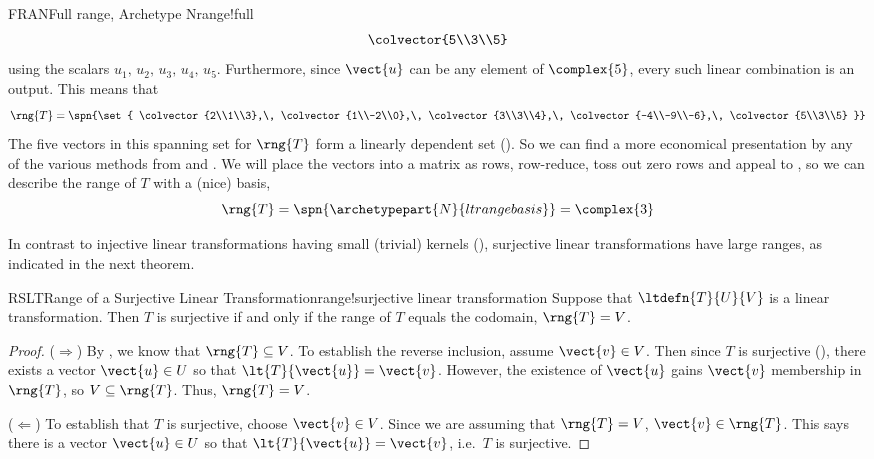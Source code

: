 \begin{example}{FRAN}{Full range, Archetype N}{range!full}
\begin{align*}
\colvector{5\\3\\5}
\end{align*}
%
using the scalars $u_1,\,u_2,\,u_3,\,u_4,\,u_5$.  Furthermore, since $\vect{u}$ can be any element of $\complex{5}$, every such linear combination is an output.  This means that
%
\begin{equation*}
\rng{T}=\spn{\set{
\colvector{2\\1\\3},\,
\colvector{1\\-2\\0},\,
\colvector{3\\3\\4},\,
\colvector{-4\\-9\\-6},\,
\colvector{5\\3\\5}
}}
\end{equation*}
%
The five vectors in this spanning set for $\rng{T}$ form a linearly dependent set ().  So we can find a more economical presentation by any of the various methods from  and .  We will place the vectors into a matrix as rows, row-reduce, toss out zero rows and appeal to , so we can describe the range of $T$ with a (nice) basis,
%
\begin{equation*}
\rng{T}=\spn{\archetypepart{N}{ltrangebasis}}=\complex{3}
\end{equation*}
%
\end{example}
%
In contrast to injective linear transformations having small (trivial) kernels (), surjective linear transformations have large ranges, as indicated in the next theorem.
%
\begin{theorem}{RSLT}{Range of a Surjective Linear Transformation}{range!surjective linear transformation}
Suppose that $\ltdefn{T}{U}{V}$ is a linear transformation.  Then $T$ is surjective if and only if the range of $T$ equals the codomain, $\rng{T}=V$.
\end{theorem}
%
\begin{proof}
($\Rightarrow$) By , we know that $\rng{T}\subseteq V$.  To establish the reverse inclusion, assume $\vect{v}\in V$.  Then since $T$ is surjective (), there exists a vector $\vect{u}\in U$ so that $\lt{T}{\vect{u}}=\vect{v}$.  However, the existence of $\vect{u}$ gains $\vect{v}$ membership in $\rng{T}$, so $V\subseteq\rng{T}$.  Thus, $\rng{T}=V$.\par
%
($\Leftarrow$)  To establish that $T$ is surjective, choose $\vect{v}\in V$.  Since we are assuming that $\rng{T}=V$, $\vect{v}\in\rng{T}$.  This says there is a vector $\vect{u}\in U$ so that $\lt{T}{\vect{u}}=\vect{v}$, i.e.\ $T$ is surjective.
%
\end{proof}
